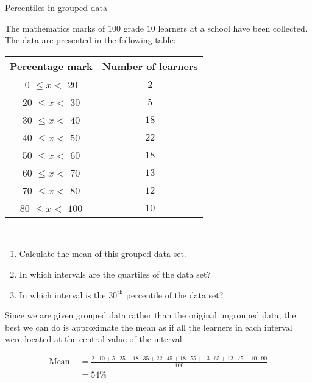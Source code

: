 \begin{wex}{Percentiles in grouped data}
{The mathematics marks of $100$ grade $10$ learners at a school have
    been collected. The data are presented in the following
    table:\\
    \begin{center}
      \begin{tabular}{|c|c|}  \hline
       
       \textbf{Percentage mark} & \textbf{Number of learners} \\  \hline

         $0$  $ \leq x < $   $20$ &  $2$ \\ \hline
        $20$  $ \leq x < $   $30$ &  $5$ \\\hline
        $30$  $ \leq x < $   $40$ & $18$ \\\hline
        $40$  $ \leq x < $   $50$ & $22$ \\\hline
        $50$  $ \leq x < $   $60$ & $18$ \\\hline
        $60$  $ \leq x < $   $70$ & $13$ \\\hline
        $70$  $ \leq x < $   $80$ & $12$ \\\hline
        $80$  $ \leq x < $  $100$ & $10$ \\\hline
   
      \end{tabular}
    \end{center}
\vspace {8pt}\\
    \begin{enumerate}[noitemsep, label=\textbf{\arabic*}.]
    \item Calculate the mean of this grouped data set.
    \item In which intervals are the quartiles of the data set?
    \item In which interval is the $30^{\mathrm{th}}$ percentile of the data set?
    \end{enumerate}
}{

  Since we are given grouped data rather than the original ungrouped
  data, the best we can do is approximate the mean as if all the
  learners in each interval were located at the central value of the
  interval.

  \begin{align*}
 \mbox{Mean } &=  \frac{
         2\:.\:10
      +  5\:.\:25
      + 18\:.\:35
      + 22\:.\:45
      + 18\:.\:55
      + 13\:.\:65
      + 12\:.\:75
      + 10\:.\:90
    }{100}\\
    &= 54\%
  \end{align*}

}
\end{wex}
